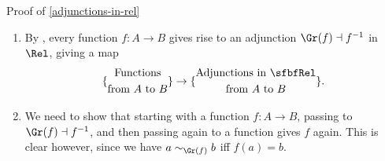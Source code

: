 \begin{Proof}{Proof of \cref{adjunctions-in-rel}}
\begin{enumerate}
            Together, the above two items show $R(a)$ to be a singleton, being thus given by $\Gr(f)$ for some function $f\colon A\to B$, which gives a map
            \[
                \{
                    \begin{gathered}
                        \text{Adjunctions in $\sfbfRel$}\\
                        \text{from $A$ to $B$}
                    \end{gathered}
                \}%
                \to
                \{
                    \begin{gathered}
                        \text{Functions}\\
                        \text{from $A$ to $B$}
                    \end{gathered}
                \}.
            \]%
            Moreover, by uniqueness of adjoints (), this implies also that $S=f^{-1}$.
        \item{}By , every function $f\colon A\to B$ gives rise to an adjunction $\Gr(f)\dashv f^{-1}$ in $\Rel$, giving a map
            \[
                \{
                    \begin{gathered}
                        \text{Functions}\\
                        \text{from $A$ to $B$}
                    \end{gathered}
                \}
                \to
                \{
                    \begin{gathered}
                        \text{Adjunctions in $\sfbfRel$}\\
                        \text{from $A$ to $B$}
                    \end{gathered}
                \}.%
            \]%
        \item{}We need to show that starting with a function $f\colon A\to B$, passing to $\Gr(f)\dashv f^{-1}$, and then passing again to a function gives $f$ again. This is clear however, since we have $a\sim_{\Gr(f)}b$ iff $f(a)=b$.

\end{enumerate}
\end{Proof}
